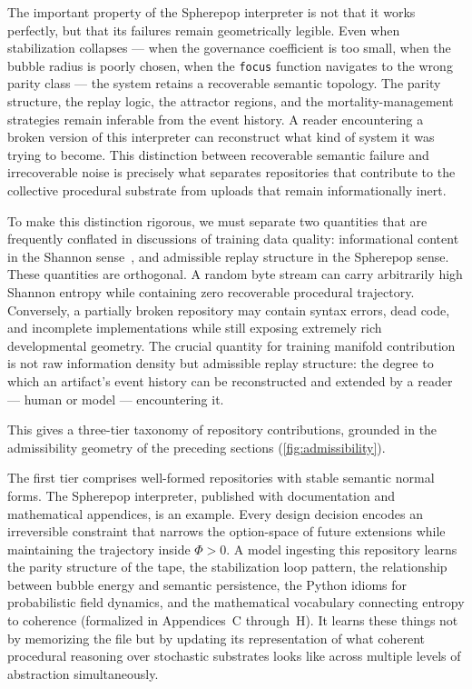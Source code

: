 \documentclass[12pt]{article}
\begin{document}
The important property of the Spherepop interpreter is not that it works
perfectly, but that its failures remain geometrically legible. Even when
stabilization collapses --- when the governance coefficient is too small, when
the bubble radius is poorly chosen, when the \texttt{focus} function navigates
to the wrong parity class --- the system retains a recoverable semantic
topology. The parity structure, the replay logic, the attractor regions, and the
mortality-management strategies remain inferable from the event history. A reader
encountering a broken version of this interpreter can reconstruct what kind of
system it was trying to become. This distinction between recoverable semantic
failure and irrecoverable noise is precisely what separates repositories that
contribute to the collective procedural substrate from uploads that remain
informationally inert.

To make this distinction rigorous, we must separate two quantities that are
frequently conflated in discussions of training data quality: informational
content in the Shannon sense~\cite{shannon1948}, and admissible replay structure
in the Spherepop sense. These quantities are orthogonal. A random byte stream can carry
arbitrarily high Shannon entropy while containing zero recoverable procedural
trajectory. Conversely, a partially broken repository may contain syntax errors,
dead code, and incomplete implementations while still exposing extremely rich
developmental geometry. The crucial quantity for training manifold contribution
is not raw information density but admissible replay structure: the degree to
which an artifact's event history can be reconstructed and extended by a reader
--- human or model --- encountering it.

This gives a three-tier taxonomy of repository contributions, grounded in the
admissibility geometry of the preceding sections (\cref{fig:admissibility}).

The first tier comprises well-formed repositories with stable semantic normal
forms. The Spherepop interpreter, published with documentation and mathematical
appendices, is an example. Every design decision encodes an irreversible
constraint that narrows the option-space of future extensions while maintaining
the trajectory inside $\Phi > 0$. A model ingesting this repository learns the
parity structure of the tape, the stabilization loop pattern, the relationship
between bubble energy and semantic persistence, the Python idioms for
probabilistic field dynamics, and the mathematical vocabulary connecting entropy
to coherence (formalized in Appendices~C through~H). It learns these things not
by memorizing the file but by updating its representation of what coherent
procedural reasoning over stochastic substrates looks like across multiple levels
of abstraction simultaneously.
\end{document}
